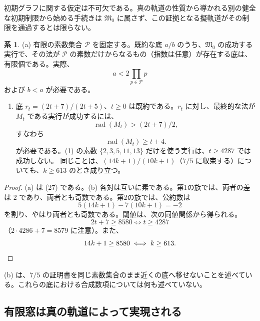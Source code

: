 \documentclass[11pt,reqno]{amsart}
\theoremstyle{definition}
\newtheorem{corollary}[theorem]{系}
\theoremstyle{definition}
\theoremstyle{remark}
\providecommand{\tightlist}{\setlength{\itemsep}{0pt}\setlength{\parskip}{0pt}}
\begin{document}
初期グラフに関する仮定は不可欠である。真の軌道の性質から導かれる別の健全な初期制限から始める手続きは \(\mathfrak M_0\) に属さず、この証拠となる擬軌道がその制限を通過するとは限らない。

\begin{samepage}
\begin{corollary}\leavevmode\label{thm:40}
(a) 有限の素数集合 \(\mathcal P\) を固定する。既約な底 \(a/b\) のうち、\(\mathfrak M_0\) の成功する実行で、その法が \(\mathcal P\) の素数だけからなるもの（指数は任意）が存在する底は、有限個である。実際、
\[
a<2\prod_{p\in\mathcal P}p
\]
および \(b<a\) が必要である。

\begin{enumerate}
\def\labelenumi{(\alph{enumi})}
\setcounter{enumi}{1}
\tightlist
\item
  底 \(r_t=(2t+7)/(2t+5)\)、\(t\ge0\) は既約である。\(r_t\) に対し、最終的な法が \(M_t\) である実行が成功するには、
  \[
  \operatorname{rad}(M_t)>(2t+7)/2,
  \]
  すなわち
  \[
  \operatorname{rad}(M_t)\ge t+4.
  \]
  が必要である。(1) の素数 \(\{2,3,5,11,13\}\) だけを使う実行は、\(t\ge4287\) では成功しない。
  同じことは、\((14k+1)/(10k+1)\)（\(7/5\) に収束する）についても、\(k\ge613\) のとき成り立つ。
\end{enumerate}
\label{thm-end:40}
\end{corollary}
\end{samepage}

\begin{proof}\leavevmode\label{proof:40}
(a) は (27) である。(b) 各対は互いに素である。第1の族では、両者の差は \(2\) であり、両者とも奇数である。第2の族では、公約数は
\[
5(14k+1)-7(10k+1)=-2
\]
を割り、やはり両者とも奇数である。閾値は、次の同値関係から得られる。
\[
2t+7\ge8580\iff t\ge4287
\]
（\(2\cdot4286+7=8579\) に注意）。また、
\[
14k+1\ge8580\iff k\ge613.\qedhere
\]
\end{proof}

(b) は、\(7/5\) の証明書を同じ素数集合のまま近くの底へ移せないことを述べている。これらの底における合成数項については何も述べていない。

\subsection{有限窓は真の軌道によって実現される}\label{sec:8.2}
\end{document}
